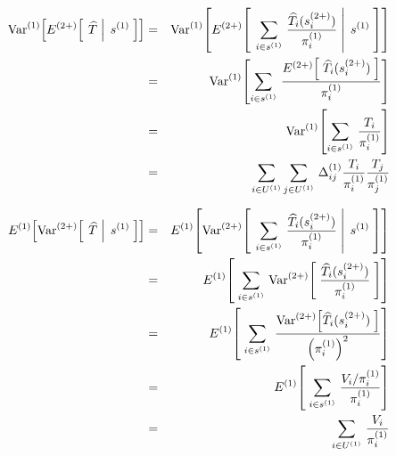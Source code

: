 \begin{eqnarray*}
\textnormal{Var}^{(1)}\!\left[E^{(2+)}\!\left[\;\left.\widehat{T}\;\right\vert\;s^{(1)}\;\right]\right]
&=&
\textnormal{Var}^{(1)}\!\left[E^{(2+)}\!\left[\;\left.
\sum_{i\in s^{(1)}}\,\frac{\widehat{T}_{i}(s^{(2+)}_{i})}{\pi^{(1)}_{i}}
\;\right\vert\;s^{(1)}\;\right]\right]
\\
&=&
\textnormal{Var}^{(1)}\!\left[\sum_{i\in s^{(1)}}\,
\frac{E^{(2+)}\!\left[\;\widehat{T}_{i}(s^{(2+)}_{i})\;\right]}{\pi^{(1)}_{i}}
\right]
\\
&=&
\textnormal{Var}^{(1)}\!\left[\sum_{i\in s^{(1)}}\,\frac{T_{i}}{\pi^{(1)}_{i}}\right]
\\
&=&
\sum_{i\in U^{(1)}}\sum_{j\in U^{(1)}}\,\Delta^{(1)}_{ij}\frac{T_{i}}{\pi^{(1)}_{i}}\frac{T_{j}}{\pi^{(1)}_{j}}
\end{eqnarray*}

\begin{eqnarray*}
E^{(1)}\!\left[\Var^{(2+)}\!\left[\;\left.\widehat{T}\;\right\vert\;s^{(1)}\;\right]\right]
&=&
E^{(1)}\!\left[\Var^{(2+)}\!\left[\;\left.
\sum_{i\in s^{(1)}}\,\frac{\widehat{T}_{i}(s^{(2+)}_{i})}{\pi^{(1)}_{i}}
\;\right\vert\;s^{(1)}\;\right]\right]
\\
&=&
E^{(1)}\!\left[\;\sum_{i\in s^{(1)}}\,
\Var^{(2+)}\!\left[\;\frac{\widehat{T}_{i}(s^{(2+)}_{i})}{\pi^{(1)}_{i}}\;\right]
\right]
\\
&=&
E^{(1)}\!\left[\;\sum_{i\in s^{(1)}}\,
\frac{\Var^{(2+)}\!\left[\widehat{T}_{i}(s^{(2+)}_{i})\;\right]}{\left(\pi^{(1)}_{i}\right)^{2}}
\right]
\\
&=&
E^{(1)}\!\left[\;\sum_{i\in s^{(1)}}\,
\frac{V_{i}/\pi^{(1)}_{i}}{\pi^{(1)}_{i}}
\right]
\\
&=&
\;\sum_{i\in U^{(1)}}\,\frac{V_{i}}{\pi^{(1)}_{i}}
\\
\end{eqnarray*}

